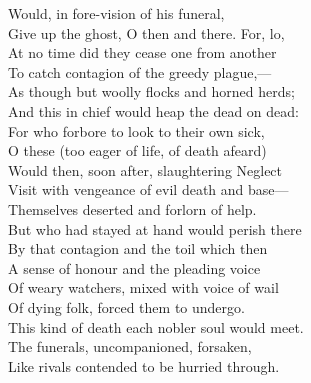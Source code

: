 Would, in fore-vision of his funeral,\\
Give up the ghost, O then and there. For, lo,\\
At no time did they cease one from another\\
To catch contagion of the greedy plague,—\\
As though but woolly flocks and horned herds;\\
And this in chief would heap the dead on dead:\\
For who forbore to look to their own sick,\\
O these (too eager of life, of death afeard)\\
Would then, soon after, slaughtering Neglect\\
Visit with vengeance of evil death and base—\\
Themselves deserted and forlorn of help.\\
But who had stayed at hand would perish there\\
By that contagion and the toil which then\\
A sense of honour and the pleading voice\\
Of weary watchers, mixed with voice of wail\\
Of dying folk, forced them to undergo.\\
This kind of death each nobler soul would meet.\\
The funerals, uncompanioned, forsaken,\\
Like rivals contended to be hurried through.

